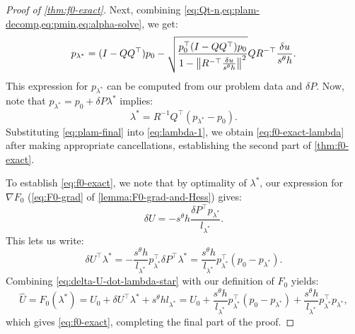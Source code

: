 \documentclass[sisc-eikonal.tex]{subfiles}
\begin{document}
\begin{proof}[Proof of \cref{thm:f0-exact}]
  Next, combining
  \cref{eq:Qt-n,eq:plam-decomp,eq:pmin,eq:alpha-solve}, we get:
  \begin{equation}\label{eq:plam-final}
    p_{\lambda^*} = {(I - QQ^\top)}p_0 - \sqrt{\frac{p_0^\top {(I - QQ^\top)} p_0}{1 - \norm{R^{-\top} \frac{\delta u}{s^\theta h}}^2}} Q R^{-\top} \frac{\delta u}{s^\theta h}.
  \end{equation}
  This expression for $p_{\lambda^*}$ can be computed from our problem
  data and $\delta P$. Now, note that
  $p_{\lambda^*} = p_0 + \delta P \lambda^*$ implies:
  \begin{equation}\label{eq:lambda-1}
    \lambda^* = R^{-1} Q^\top (p_{\lambda^*} - p_0).
  \end{equation}
  Substituting \cref{eq:plam-final} into \cref{eq:lambda-1}, we obtain
  \cref{eq:f0-exact-lambda} after making appropriate cancellations,
  establishing the second part of \cref{thm:f0-exact}.

  To establish \cref{eq:f0-exact}, we note that by optimality of
  $\lambda^*$, our expression for $\nabla F_0$ (\cref{eq:F0-grad} of
  \cref{lemma:F0-grad-and-Hess}) gives:
  \begin{equation}
    \delta U = -s^\theta h \frac{\delta P^\top p_{\lambda^*}}{l_{\lambda^*}}.
  \end{equation}
  This lets us write:
  \begin{equation}\label{eq:delta-U-dot-lambda-star}
    \delta U^\top \lambda^* = -\frac{s^\theta h}{l_{\lambda^*}} p_{\lambda^*}^\top \delta P^\top \lambda^* = \frac{s^\theta h}{l_{\lambda^*}} p_{\lambda^*}^\top {(p_0 - p_{\lambda^*})}.
  \end{equation}
  Combining \cref{eq:delta-U-dot-lambda-star} with our definition of
  $F_0$ yields:
  \begin{equation}
    \hat{U} = F_0(\lambda^*) = U_0 + \delta U^\top \lambda^* + s^\theta h l_{\lambda^*} = U_0 + \frac{s^\theta h}{l_{\lambda^*}} p_{\lambda^*}^\top {(p_0 - p_{\lambda^*})} + \frac{s^\theta h}{l_{\lambda^*}} p_{\lambda^*}^\top p_{\lambda^*},
  \end{equation}
  which gives \cref{eq:f0-exact}, completing the final part of the
  proof.
\end{proof}
\end{document}
